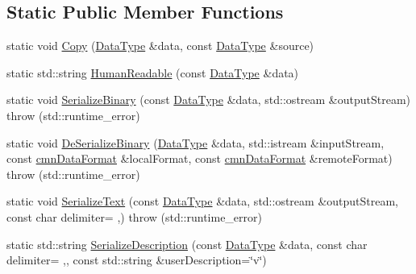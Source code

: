 \subsection*{Static Public Member Functions}
\begin{DoxyCompactItemize}
\item 
static void \hyperlink{classcmn_data_3_01vct_dynamic_vector_3_01__element_type_01_4_01_4_a0cb719326922e6b70028d52cdc4958e6}{Copy} (\hyperlink{classcmn_data_3_01vct_dynamic_vector_3_01__element_type_01_4_01_4_a00a493d9c26fcb200ced1375b3500d17}{Data\+Type} \&data, const \hyperlink{classcmn_data_3_01vct_dynamic_vector_3_01__element_type_01_4_01_4_a00a493d9c26fcb200ced1375b3500d17}{Data\+Type} \&source)
\item 
static std\+::string \hyperlink{classcmn_data_3_01vct_dynamic_vector_3_01__element_type_01_4_01_4_a6257dbc18f896f817b84acdf06ddd048}{Human\+Readable} (const \hyperlink{classcmn_data_3_01vct_dynamic_vector_3_01__element_type_01_4_01_4_a00a493d9c26fcb200ced1375b3500d17}{Data\+Type} \&data)
\item 
static void \hyperlink{classcmn_data_3_01vct_dynamic_vector_3_01__element_type_01_4_01_4_a960380b9c9996460445be898c6b3a7c4}{Serialize\+Binary} (const \hyperlink{classcmn_data_3_01vct_dynamic_vector_3_01__element_type_01_4_01_4_a00a493d9c26fcb200ced1375b3500d17}{Data\+Type} \&data, std\+::ostream \&output\+Stream)  throw (std\+::runtime\+\_\+error)
\item 
static void \hyperlink{classcmn_data_3_01vct_dynamic_vector_3_01__element_type_01_4_01_4_abb0f206b64a13f98f9f4b7c7b70cd634}{De\+Serialize\+Binary} (\hyperlink{classcmn_data_3_01vct_dynamic_vector_3_01__element_type_01_4_01_4_a00a493d9c26fcb200ced1375b3500d17}{Data\+Type} \&data, std\+::istream \&input\+Stream, const \hyperlink{classcmn_data_format}{cmn\+Data\+Format} \&local\+Format, const \hyperlink{classcmn_data_format}{cmn\+Data\+Format} \&remote\+Format)  throw (std\+::runtime\+\_\+error)
\item 
static void \hyperlink{classcmn_data_3_01vct_dynamic_vector_3_01__element_type_01_4_01_4_afb5f52a799301a9eb00575efee47ecf0}{Serialize\+Text} (const \hyperlink{classcmn_data_3_01vct_dynamic_vector_3_01__element_type_01_4_01_4_a00a493d9c26fcb200ced1375b3500d17}{Data\+Type} \&data, std\+::ostream \&output\+Stream, const char delimiter= \textquotesingle{},\textquotesingle{})  throw (std\+::runtime\+\_\+error)
\item 
static std\+::string \hyperlink{classcmn_data_3_01vct_dynamic_vector_3_01__element_type_01_4_01_4_a4c047d9159d531c941d8938588da249e}{Serialize\+Description} (const \hyperlink{classcmn_data_3_01vct_dynamic_vector_3_01__element_type_01_4_01_4_a00a493d9c26fcb200ced1375b3500d17}{Data\+Type} \&data, const char delimiter= \textquotesingle{},\textquotesingle{}, const std\+::string \&user\+Description=\char`\"{}v\char`\"{})

\end{DoxyCompactItemize}
